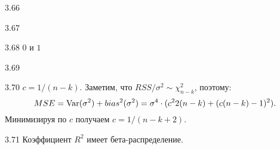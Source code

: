 \protect \hypertarget {soln:3.66}{}
\begin{solution}{{3.66}}
\end{solution}
\protect \hypertarget {soln:3.67}{}
\begin{solution}{{3.67}}
\end{solution}
\protect \hypertarget {soln:3.68}{}
\begin{solution}{{3.68}}
$0$ и $1$
\end{solution}
\protect \hypertarget {soln:3.69}{}
\begin{solution}{{3.69}}
\end{solution}
\protect \hypertarget {soln:3.70}{}
\begin{solution}{{3.70}}
$c=1/(n-k)$.
Заметим, что $RSS/\sigma^2 \sim \chi^2_{n-k}$, поэтому:
\[
MSE = \operatorname{Var}(\sigma^2) + bias^2(\sigma^2)=\sigma^4 \cdot (c^2 2(n-k) + (c(n-k)-1)^2).
\]
Минимизируя по $c$ получаем $c=1/(n-k+2)$.
\end{solution}
\protect \hypertarget {soln:3.71}{}
\begin{solution}{{3.71}}
  Коэффициент $R^2$ имеет бета-распределение.
\end{solution}
